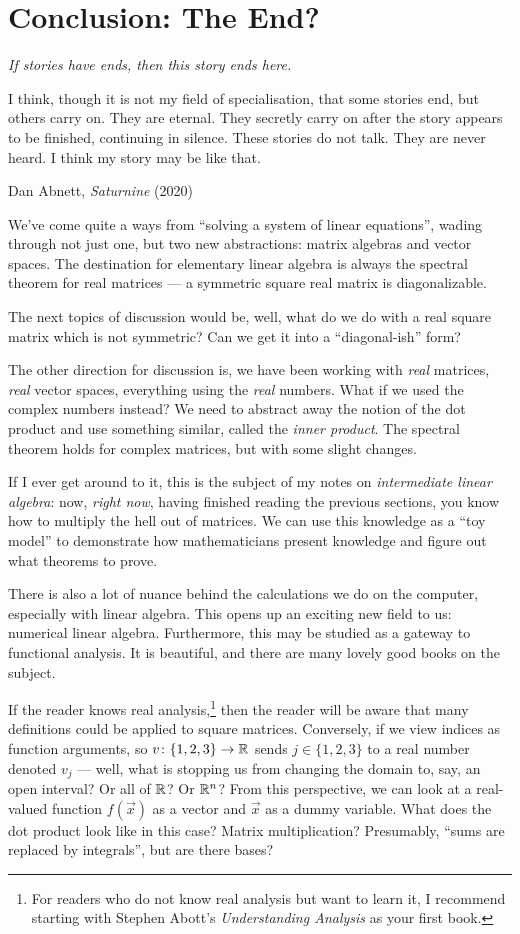 \section{Conclusion: The End?}

\epigraph{\itshape If stories have ends, then this story ends here.

I think, though it is not my field of specialisation, that some stories
end, but others carry on. They are eternal. They secretly carry on after
the story appears to be finished, continuing in silence. These stories
do not talk. They are never heard. I think my story may be like
that.}{Dan Abnett, \textit{Saturnine} (2020)}

\M
We've come quite a ways from ``solving a system of linear equations'',
wading through not just one, but two new abstractions: matrix algebras
and vector spaces. The destination for elementary linear algebra is
always the spectral theorem for real matrices --- a symmetric square
real matrix is diagonalizable.

The next topics of discussion would be, well, what do we do with a real
square matrix which is not symmetric? Can we get it into a
``diagonal-ish'' form?

The other direction for discussion is, we have been working with
\emph{real} matrices, \emph{real} vector spaces, everything using the
\emph{real} numbers. What if we used the complex numbers instead? We
need to abstract away the notion of the dot product and use something
similar, called the \emph{inner product}. The spectral theorem holds for
complex matrices, but with some slight changes.

If I ever get around to it, this is the subject of my notes on
\emph{intermediate linear algebra}: now, \emph{right now}, having
finished reading the previous sections, you know how to multiply the
hell out of matrices. We can use this knowledge as a ``toy model'' to
demonstrate how mathematicians present knowledge and figure out what
theorems to prove.

There is also a lot of nuance behind the calculations we do on the
computer, especially with linear algebra. This opens up an exciting new
field to us: numerical linear algebra. Furthermore, this may be studied
as a gateway to functional analysis. It is beautiful, and there are many
lovely good books on the subject.

If the reader knows real analysis,\footnote{For readers who do not know
real analysis but want to learn it, I recommend starting with Stephen
Abott's \textit{Understanding Analysis} as your first book.} then the reader will be aware that
many definitions could be applied to square matrices. Conversely, if we
view indices as function arguments, so $v\colon\{1,2,3\}\to\mathbb{R}$ sends
$j\in\{1,2,3\}$ to a real number denoted $v_{j}$ --- well, what is
stopping us from changing the domain to, say, an open interval? Or all
of $\mathbb{R}$? Or $\mathbb{R}^{n}$? From this perspective, we can look at a
real-valued function $f(\vec{x})$ as a vector and $\vec{x}$ as a dummy
variable. What does the dot product look like in this case? Matrix
multiplication? Presumably, ``sums are replaced by integrals'', but are
there bases?

